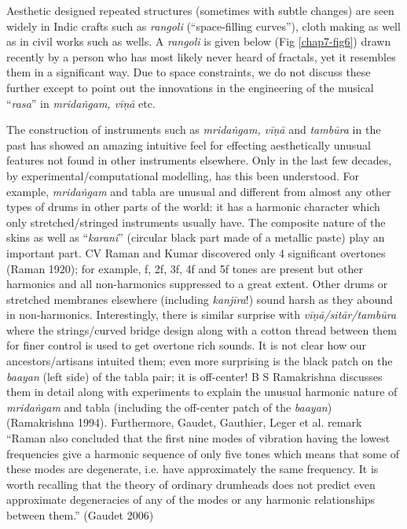 Aesthetic designed repeated structures (sometimes with subtle changes) are seen widely in Indic crafts such as \textsl{rangoli} (“space-filling curves”), cloth making as well as in civil works such as wells. A \textsl{rangoli} is given below (Fig \ref{chap7-fig6}) drawn recently by a person who has most likely never heard of fractals, yet it resembles them in a significant way. Due to space constraints, we do not discuss these further except to point out the innovations in the engineering of the musical “\textsl{rasa}” in \textsl{mridaṅgam, vīṇā} etc.

The construction of instruments such as \textsl{mridaṅgam, vīṇā} and \textsl{tambūra} in the past has showed an amazing intuitive feel for effecting aesthetically unusual features not found in other instruments elsewhere. Only in the last few decades, by experimental/computational modelling, has this been understood. For example, \textsl{mridaṅgam} and tabla are unusual and different from almost any other types of drums in other parts of the world: it has a harmonic character which only stretched/stringed instruments usually have. The composite nature of the skins as well as “\textsl{karani}” (circular black part made of a metallic paste) play an important part.  CV Raman and Kumar discovered only 4 significant overtones (Raman 1920); for example, f, 2f, 3f, 4f and 5f tones are present but other harmonics and all non-harmonics suppressed to a great extent. Other drums or stretched membranes elsewhere (including \textsl{kanjīra}!) sound harsh as they abound in non-harmonics. Interestingly, there is similar surprise with \textsl{vīṇā/sitār/tambūra} where the strings/curved bridge design along with a cotton thread between them for finer control is used to get overtone rich sounds. It is not clear how our ancestors/artisans intuited them; even more surprising is the black patch on the \textsl{baayan} (left side) of the tabla pair; it is off-center! B S Ramakrishna discusses them in detail along with experiments to explain the unusual harmonic nature of \textsl{mridaṅgam} and tabla (including the off-center patch of the \textsl{baayan}) (Ramakrishna 1994). Furthermore, Gaudet, Gauthier, Leger et al. remark “Raman also concluded that the first nine modes of vibration having the lowest frequencies give a harmonic sequence of only five tones which means that some of these modes are degenerate, i.e. have approximately the same frequency. It is worth recalling that the theory of ordinary drumheads does not predict even approximate degeneracies of any of the modes or any harmonic relationships between them.” (Gaudet 2006)

